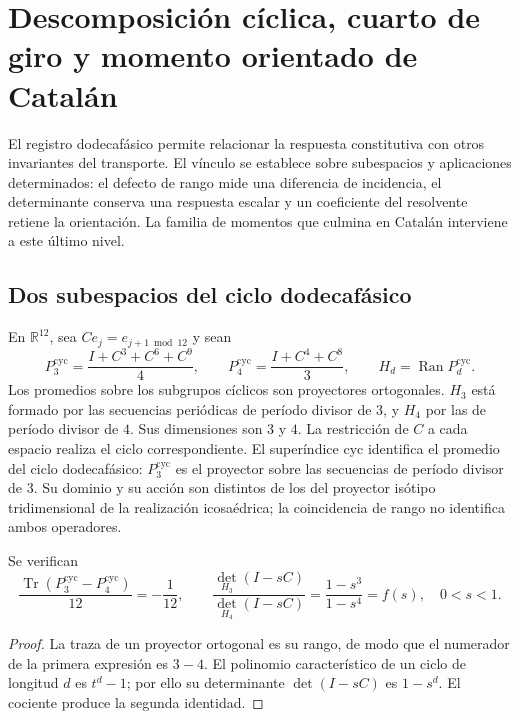 \section{Descomposición cíclica, cuarto de giro y momento orientado de Catalán}
\label{iii:iii:sec:catalan}

El registro dodecafásico permite relacionar la respuesta constitutiva con
otros invariantes del transporte. El vínculo se establece sobre subespacios
y aplicaciones determinados: el defecto de rango mide una diferencia de
incidencia, el determinante conserva una respuesta escalar y un coeficiente
del resolvente retiene la orientación. La familia de momentos que culmina
en Catalán interviene a este último nivel.

\subsection{Dos subespacios del ciclo dodecafásico}

En $\mathbb R^{12}$, sea $C e_j=e_{j+1\bmod12}$ y sean
\begin{equation}
 P_3^{\mathrm{cyc}}=\frac{I+C^3+C^6+C^9}{4},\qquad
 P_4^{\mathrm{cyc}}=\frac{I+C^4+C^8}{3},\qquad
 H_d=\operatorname{Ran}P_d^{\mathrm{cyc}}.
 \label{iii:iii:eq:projectors34}
\end{equation}
Los promedios sobre los subgrupos cíclicos son proyectores ortogonales.
$H_3$ está formado por las secuencias periódicas de período divisor de $3$,
y $H_4$ por las de período divisor de $4$. Sus dimensiones son $3$ y $4$.
La restricción de $C$ a cada espacio realiza el ciclo correspondiente.
El superíndice $\mathrm{cyc}$ identifica el promedio del ciclo dodecafásico:
$P_3^{\mathrm{cyc}}$ es el proyector sobre las secuencias de período divisor
de $3$. Su dominio y su acción son distintos de los del proyector isótipo
tridimensional de la realización icosaédrica; la coincidencia de rango
no identifica ambos operadores.

\begin{proposition}
Se verifican
\begin{equation}
 \frac{\operatorname{Tr}(P_3^{\mathrm{cyc}}-P_4^{\mathrm{cyc}})}{12}=-\frac1{12},\qquad
 \frac{\det_{H_3}(I-sC)}{\det_{H_4}(I-sC)}
 =\frac{1-s^3}{1-s^4}=f(s),\quad 0<s<1.
 \label{iii:iii:eq:trace-det}
\end{equation}
\end{proposition}
\begin{proof}
La traza de un proyector ortogonal es su rango, de modo que el numerador
de la primera expresión es $3-4$. El polinomio característico de un ciclo
de longitud $d$ es $t^d-1$; por ello su determinante $\det(I-sC)$ es
$1-s^d$. El cociente produce la segunda identidad.
\end{proof}

